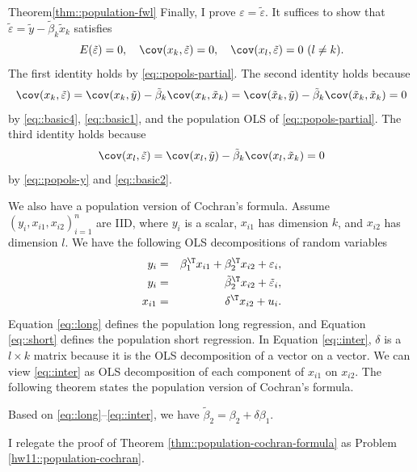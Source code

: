 \begin{myproof}{Theorem}{\ref{thm::population-fwl}}
Finally, I prove $\varepsilon = \tilde{\varepsilon}$. It suffices to show that $\tilde{\varepsilon} = \tilde{y}  -  \tilde{\beta}_k  \tilde{x}_{k}  $ satisfies
$$
E(\tilde{\varepsilon}) = 0, \quad \cov(  x_k, \tilde{\varepsilon} ) = 0,\quad
\cov( x_l, \tilde{\varepsilon}) = 0\ (l\neq k).
$$
The first identity holds by \eqref{eq::popols-partial}. The second identity holds because
$$
\cov(  x_k, \tilde{\varepsilon} ) = \cov(x_k,  \tilde{y}) - \tilde{\beta}_k  \cov(x_k, \tilde{x}_{k} )  
= \cov(\tilde x_k,  \tilde{y}) - \tilde{\beta}_k  \cov(\tilde x_k, \tilde{x}_{k} )  =0
$$
by \eqref{eq::basic4}, \eqref{eq::basic1}, and the population OLS of \eqref{eq::popols-partial}. The third identity holds because
$$
\cov(  x_l, \tilde{\varepsilon} ) = \cov(x_l,  \tilde{y}) - \tilde{\beta}_k  \cov(x_l, \tilde{x}_{k} )   = 0
$$
by \eqref{eq::popols-y} and \eqref{eq::basic2}. 
\end{myproof}


We also have a population version of Cochran's formula. 
Assume $(y_i, x_{i1}, x_{i2})_{i=1}^n$ are IID, where $y_i$ is a scalar, $x_{i1}$ has dimension $k$, and $x_{i2}$ has dimension $l$. 
We have the following OLS decompositions of random variables
\begin{eqnarray}
y_i &=& \beta_1 ^{\T} x_{i1} + \beta_2 ^{\T}x_{i2} + \varepsilon_i , \label{eq::long}\\
y_i&=&\tilde{\beta}_2 ^{\T} x_{i2} + \tilde{\varepsilon}_i, \label{eq::short}\\
x_{i1} &=& \delta ^{\T} x_{i2} + u_i . \label{eq::inter}
\end{eqnarray}
Equation \eqref{eq::long} defines the population long regression, and Equation \eqref{eq::short} defines the population short regression. In Equation \eqref{eq::inter}, $\delta$ is a $l \times k$ matrix because it is the OLS decomposition of a vector on a vector. We can view \eqref{eq::inter} as OLS decomposition of each component of $x_{i1}$ on $x_{i2}$. 
The following theorem states the population version of Cochran's formula.


\begin{theorem}
\label{thm::population-cochran-formula}
Based on \eqref{eq::long}--\eqref{eq::inter}, we have $\tilde{\beta}_2 = \beta_2 + \delta \beta_1.$
\end{theorem}


I relegate the proof of Theorem \ref{thm::population-cochran-formula} as Problem \ref{hw11::population-cochran}. 



